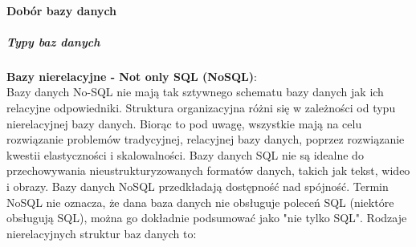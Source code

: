 \documentclass[12pt, a4paper, twoside, openany]{book}
\begin{document}
\paragraph{Dobór bazy danych}

\subparagraph{Typy baz danych\\}

\textbf{Bazy nierelacyjne - Not only SQL (NoSQL)}:\\
Bazy danych No-SQL nie mają tak sztywnego schematu bazy danych jak ich relacyjne odpowiedniki. Struktura organizacyjna różni się w zależności od typu nierelacyjnej bazy danych. Biorąc to pod uwagę, wszystkie mają na celu rozwiązanie problemów tradycyjnej, relacyjnej bazy danych, poprzez rozwiązanie kwestii elastyczności i skalowalności. Bazy danych SQL nie są idealne do przechowywania nieustrukturyzowanych formatów danych, takich jak tekst, wideo i obrazy. Bazy danych NoSQL przedkładają dostępność nad spójność.
Termin NoSQL nie oznacza, że dana baza danych nie obsługuje poleceń SQL (niektóre obsługują SQL), można go dokładnie podsumować jako "nie tylko SQL".
Rodzaje nierelacyjnych struktur baz danych to:
\end{document}
